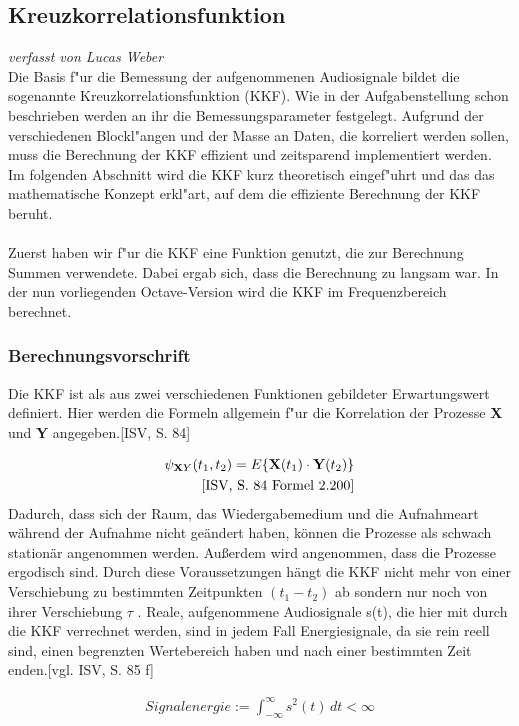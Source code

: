 \subsection{Kreuzkorrelationsfunktion}
\textit{verfasst von Lucas Weber\\}
Die Basis f"ur die Bemessung der aufgenommenen Audiosignale bildet die sogenannte Kreuzkorrelationsfunktion (KKF). Wie in der Aufgabenstellung schon beschrieben werden an ihr die Bemessungsparameter festgelegt. Aufgrund der verschiedenen Blockl"angen und der Masse an Daten, die korreliert werden sollen, muss die Berechnung der KKF effizient und zeitsparend implementiert werden. Im folgenden Abschnitt wird die KKF kurz theoretisch eingef"uhrt und das das mathematische Konzept erkl"art, auf dem die effiziente Berechnung der KKF beruht.
\\\\
Zuerst haben wir f"ur die KKF eine Funktion genutzt, die zur Berechnung Summen verwendete. Dabei ergab sich, dass die Berechnung zu langsam war. In der nun vorliegenden Octave-Version wird die KKF im Frequenzbereich berechnet.
\subsubsection{Berechnungsvorschrift}
Die KKF ist als aus zwei verschiedenen Funktionen gebildeter Erwartungswert definiert. Hier werden die Formeln allgemein f"ur die Korrelation der Prozesse \textbf{X} und \textbf{Y} angegeben.[ISV, S. 84] 

\begin{align}
\psi_{\textbf XY}(t_1, t_2) = E\lbrace\textbf{X}(t_1)\cdot\textbf{Y}(t_2)\rbrace\\\text{[ISV, S. 84 Formel 2.200]}
\end{align}
Dadurch, dass sich der Raum, das Wiedergabemedium und die Aufnahmeart während der Aufnahme nicht geändert haben, können die Prozesse als schwach stationär angenommen werden. Außerdem wird angenommen, dass die Prozesse ergodisch sind. Durch diese Voraussetzungen hängt die KKF nicht mehr von einer Verschiebung zu bestimmten Zeitpunkten $(t_1 - t_2)$ ab sondern nur noch von ihrer Verschiebung $\tau$ . Reale, aufgenommene Audiosignale s(t), die hier mit durch die KKF verrechnet werden, sind in jedem Fall Energiesignale, da sie rein reell sind, einen begrenzten Wertebereich haben und nach einer bestimmten Zeit enden.[vgl. ISV, S. 85 f]

\begin{align}
Signalenergie := \int_{-\infty}^{\infty} s^2(t) \,dt < \infty
\end{align}

